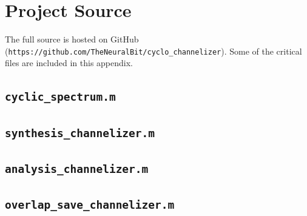 \documentclass[12pt]{report}
\begin{document}

\nocite{*}


%

\appendix

\chapter{Project Source}
\label{sec:source}
The full source is hosted on GitHub
(\texttt{https://github.com/TheNeuralBit/cyclo\_channelizer}). Some of the
critical files are included in this appendix.

\section{\texttt{cyclic\_spectrum.m}}

\section{\texttt{synthesis\_channelizer.m}}

\section{\texttt{analysis\_channelizer.m}}

\section{\texttt{overlap\_save\_channelizer.m}}

\end{document}
